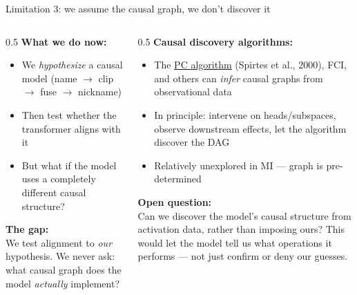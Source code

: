 \documentclass[10pt,aspectratio=169]{beamer}
\begin{document}
\begin{frame}{Limitation 3: we assume the causal graph, we don't discover it}

\begin{columns}[T]
\begin{column}{0.5\textwidth}
\textbf{What we do now:}
\begin{itemize}
  \item We \emph{hypothesize} a causal model (name $\to$ clip $\to$ fuse $\to$ nickname)
  \item Then test whether the transformer aligns with it
  \item But what if the model uses a completely different causal structure?
\end{itemize}

\vspace{0.5em}
\textbf{The gap:}\\
We test alignment to \emph{our} hypothesis. We never ask: what causal graph does the model \emph{actually} implement?
\end{column}

\begin{column}{0.5\textwidth}
\textbf{Causal discovery algorithms:}
\begin{itemize}
  \item The \href{https://mitpress.mit.edu/9780262194440/causation-prediction-and-search/}{PC algorithm} (Spirtes et al., 2000), FCI, and others can \emph{infer} causal graphs from observational data
  \item In principle: intervene on heads/subspaces, observe downstream effects, let the algorithm discover the DAG
  \item Relatively unexplored in MI --- graph is pre-determined
\end{itemize}

\vspace{0.5em}
\textbf{Open question:}\\
Can we discover the model's causal structure from activation data, rather than imposing ours? This would let the model tell us what operations it performs --- not just confirm or deny our guesses.
\end{column}
\end{columns}
\end{frame}
\end{document}
